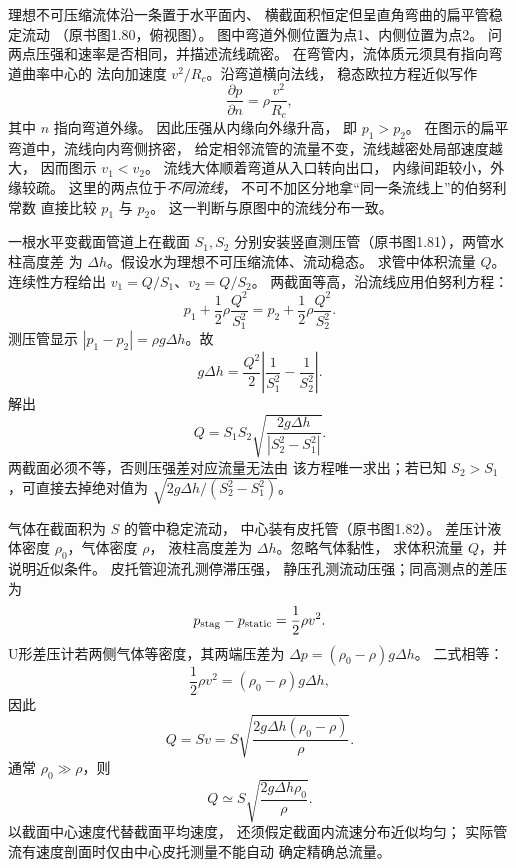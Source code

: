 
理想不可压缩流体沿一条置于水平面内、
横截面积恒定但呈直角弯曲的扁平管稳定流动
（原书图1.80，俯视图）。
图中弯道外侧位置为点1、内侧位置为点2。
问两点压强和速率是否相同，并描述流线疏密。
\exsolution
在弯管内，流体质元须具有指向弯道曲率中心的
法向加速度 $v^2/R_c$。沿弯道横向法线，
稳态欧拉方程近似写作
\[
\frac{\partial p}{\partial n}
=\rho\frac{v^2}{R_c},
\]
其中 $n$ 指向弯道外缘。
因此压强从内缘向外缘升高，
即 $\boxed{p_1>p_2}$。
在图示的扁平弯道中，流线向内弯侧挤密，
给定相邻流管的流量不变，流线越密处局部速度越大，
因而图示 $\boxed{v_1<v_2}$。
流线大体顺着弯道从入口转向出口，
内缘间距较小，外缘较疏。
\excheck 这里的两点位于\emph{不同流线}，
不可不加区分地拿“同一条流线上”的伯努利常数
直接比较 $p_1$ 与 $p_2$。
这一判断与原图中的流线分布一致。

一根水平变截面管道上在截面 $S_1,S_2$
分别安装竖直测压管（原书图1.81），两管水柱高度差
为 $\Delta h$。假设水为理想不可压缩流体、流动稳态。
求管中体积流量 $Q$。
\exsolution
连续性方程给出
$v_1=Q/S_1$、$v_2=Q/S_2$。
两截面等高，沿流线应用伯努利方程：
\[
p_1+\frac12\rho\frac{Q^2}{S_1^2}
=p_2+\frac12\rho\frac{Q^2}{S_2^2}.
\]
测压管显示
$|p_1-p_2|=\rho g\Delta h$。故
\[
g\Delta h=\frac{Q^2}{2}
\left|\frac1{S_1^2}-\frac1{S_2^2}\right|.
\]
解出
\[
\boxed{Q=S_1S_2\sqrt{
\frac{2g\Delta h}{|S_2^2-S_1^2|}}}.
\]
\excheck 两截面必须不等，否则压强差对应流量无法由
该方程唯一求出；若已知
$S_2>S_1$，可直接去掉绝对值为
$\sqrt{2g\Delta h/(S_2^2-S_1^2)}$。

气体在截面积为 $S$ 的管中稳定流动，
中心装有皮托管（原书图1.82）。
差压计液体密度 $\rho_0$，气体密度 $\rho$，
液柱高度差为 $\Delta h$。忽略气体黏性，
求体积流量 $Q$，并说明近似条件。
\exsolution
皮托管迎流孔测停滞压强，
静压孔测流动压强；同高测点的差压为
\[
p_{\rm stag}-p_{\rm static}=\frac12\rho v^2.
\]
U形差压计若两侧气体等密度，其两端压差为
$\Delta p=(\rho_0-\rho)g\Delta h$。
二式相等：
\[
\frac12\rho v^2=(\rho_0-\rho)g\Delta h,
\]
因此
\[
\boxed{Q=Sv=S\sqrt{
\frac{2g\Delta h(\rho_0-\rho)}{\rho}}}.
\]
通常 $\rho_0\gg\rho$，则
\[
\boxed{Q\simeq S\sqrt{\frac{2g\Delta h\rho_0}{\rho}}}.
\]
\excheck 以截面中心速度代替截面平均速度，
还须假定截面内流速分布近似均匀；
实际管流有速度剖面时仅由中心皮托测量不能自动
确定精确总流量。

